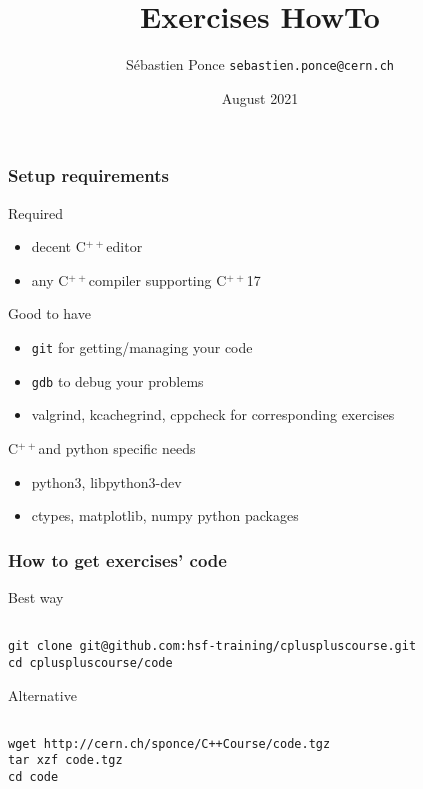 \documentclass[compress]{beamer}
\title{Exercises HowTo}
\author[S. Ponce]{S\'ebastien Ponce  \texttt{sebastien.ponce@cern.ch}}
\institute{CERN}
\date{August 2021}
\newcommand{\cpp}{C$^{++}$}
\begin{document}
\begin{frame}
  \titlepage
\end{frame}

\begin{frame}
  \frametitle{Setup requirements}
  \begin{exampleblock}{Required}
    \begin{itemize}
    \item decent \cpp editor
    \item any \cpp compiler supporting \cpp17
    \end{itemize}
  \end{exampleblock}
  \begin{alertblock}{Good to have}
    \begin{itemize}
    \item \texttt{git} for getting/managing your code
    \item \texttt{gdb} to debug your problems
    \item valgrind, kcachegrind, cppcheck for corresponding exercises
    \end{itemize}
  \end{alertblock}
  \begin{block}{\cpp and python specific needs}
    \begin{itemize}
    \item python3, libpython3-dev
    \item ctypes, matplotlib, numpy python packages
    \end{itemize}
  \end{block}
\end{frame}

\begin{frame}[fragile]
  \setlength{\textwidth}{11.2cm}
  \frametitle{How to get exercises' code}
  \begin{exampleblock}{Best way}
    \small
    \begin{verbatim}

git clone git@github.com:hsf-training/cpluspluscourse.git
cd cpluspluscourse/code
    \end{verbatim}
  \end{exampleblock}
  \begin{alertblock}{Alternative}
    \small
    \begin{verbatim}

wget http://cern.ch/sponce/C++Course/code.tgz
tar xzf code.tgz
cd code
    \end{verbatim}
  \end{alertblock}
\end{frame}
\end{document}
